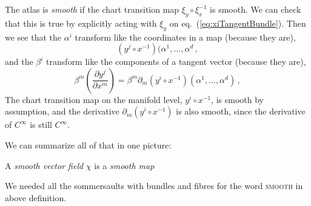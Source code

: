 \documentclass[11pt, a4paper, twocolumn]{article} %
\begin{document}
The atlas is \textit{smooth} if the chart transition map $\xi_y\circ\xi_x^{-1}$ is smooth.
We can check that this is true by explicitly acting with $\xi_y$ on eq.~(\ref{eq:xiTangentBundle}).
Then we see that the $\alpha^i$ transform like the coordinates in a map (because they are),
\begin{equation}
    (y^j\circ x^{-1})(\alpha^1,\ldots,\alpha^d\,,
\end{equation}
and the
$\beta^i$ transform like the components of a tangent vector (because they are),
\begin{equation}
    \beta^m \left( \frac{\partial y^j}{\partial x^m} \right) = \beta^m \partial_m(y^i\circ x^{-1})(\alpha^1,\ldots,\alpha^d)\,,
\end{equation}
The chart transition map on the manifold level, $y^i\circ x^{-1}$, is smooth by assumption,
and the derivative $\partial_m (y^i \circ x^{-1})$ is also smooth, since the derivative of $C^\infty$ is still $C^\infty$.

We can summarize all of that in one picture:

\begin{center}
\end{center}

\begin{defn}
    A \textit{smooth vector field} $\chi$ is a \textit{smooth map}
    \label{def:vectorField}
    \begin{center}
    \end{center}
\end{defn}
\begin{note}
    We needed all the sommersaults with bundles and fibres for the word \textsc{smooth} in above definition.
\end{note}
\end{document}
